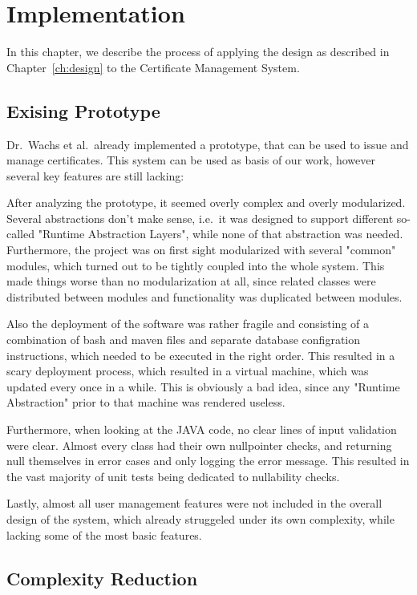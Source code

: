 \chapter{Implementation}\label{ch:implementation}
In this chapter, we describe the process of applying the design as described in Chapter~\ref{ch:design} to the
Certificate Management System.

\section{Exising Prototype}\label{sec:exisingPrototype}

Dr.\ Wachs et al.\ already implemented a prototype, that can be used to issue and manage certificates.
This system can be used as basis of our work, however several key features are still lacking:

After analyzing the prototype, it seemed overly complex and overly modularized.
Several abstractions don't make sense, i.e.\ it was designed to support different so-called "Runtime Abstraction
Layers", while none of that abstraction was needed.
Furthermore, the project was on first sight modularized with several "common" modules, which turned out to be tightly
coupled into the whole system.
This made things worse than no modularization at all, since related classes were distributed between modules and
functionality was duplicated between modules.

Also the deployment of the software was rather fragile and consisting of a combination of bash and maven files and
separate database configration instructions, which needed to be executed in the right order.
This resulted in a scary deployment process, which resulted in a virtual machine, which was updated every once in a
while.
This is obviously a bad idea, since any "Runtime Abstraction" prior to that machine was rendered useless.

Furthermore, when looking at the JAVA code, no clear lines of input validation were clear.
Almost every class had their own nullpointer checks, and returning null themselves in error cases and only logging the
error message.
This resulted in the vast majority of unit tests being dedicated to nullability checks.

Lastly, almost all user management features were not included in the overall design of the system, which already
struggeled under its own complexity, while lacking some of the most basic features.

\section{Complexity Reduction}

